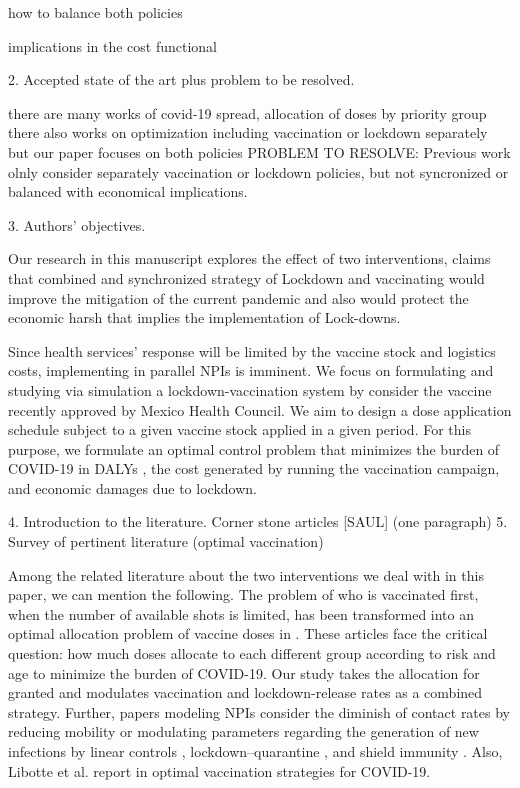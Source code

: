 how to balance both policies

implications in the cost functional

2. Accepted state of the art plus problem to be resolved.


there are many works of covid-19 spread, 
allocation of doses by priority group 
there also works on optimization including vaccination or lockdown separately but our paper focuses on both policies
PROBLEM TO RESOLVE:
    Previous work olnly  consider separately vaccination or lockdown policies, but not syncronized or balanced with economical implications.


3. Authors’ objectives.

    Our research in this manuscript explores the effect of two interventions, 
claims that  combined and synchronized strategy of Lockdown and vaccinating
would improve the mitigation of the current pandemic
and also would protect the economic harsh that implies the implementation of Lock-downs.

    Since health services' response will be limited by the vaccine stock
and logistics costs, implementing in parallel NPIs is imminent. We focus on
formulating and studying via simulation a lockdown-vaccination system by 
consider the vaccine recently approved by  Mexico Health Council.
We aim to design a dose application schedule subject to a given vaccine 
stock applied in a given period. For this purpose, we formulate an 
optimal control problem that minimizes the burden of  COVID-19 in DALYs 
\cite{WhoDALY}, the cost generated by   running the vaccination 
campaign, and economic damages due to lockdown.

4. Introduction to the literature. 
    Corner stone articles [SAUL] (one paragraph)
5. Survey of pertinent literature (optimal vaccination)

    Among the related literature about the two interventions we deal with in this paper, 
we can mention the following. The problem of who is vaccinated first, when the number
of available shots is limited, has been transformed into an optimal allocation problem
of vaccine doses in \cite{Bubar2020,Matrajt2020,Buckner2020}.  
These articles face the critical question:  how much doses allocate to each different
group according to risk and age to minimize the burden of COVID-19. Our study takes
the allocation for granted and modulates vaccination and lockdown-release rates as
a combined strategy. Further, papers modeling NPIs consider the diminish of contact 
rates by reducing mobility or modulating parameters regarding the generation of new
infections by linear controls \cite{Naraigh2020,Ullah2020},
lockdown--quarantine \cite{Mandal2020}, and shield immunity
\cite{Weitz2020}. Also, Libotte et al. report in \cite{Libotte2020} optimal vaccination
strategies for COVID-19.  


